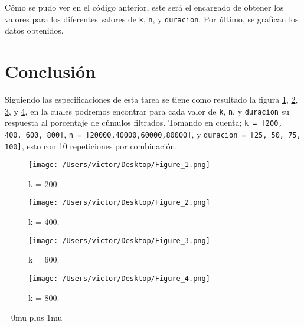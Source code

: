 \documentclass{article}
\begin{document}
Cómo se pudo ver en el código anterior, este será el encargado de obtener los valores para los diferentes valores de \texttt{k}, \texttt{n}, y \texttt{duracion}. Por último, se grafícan los datos obtenidos. \\


\section{Conclusión}

Siguiendo las especificaciones de esta tarea se tiene como resultado la figura \ref{fig:cuadro.1}, \ref{fig:cuadro.2}, \ref{fig:cuadro.3}, y \ref{fig:cuadro.4}, en la cuales podremos encontrar para cada valor de \texttt{k}, \texttt{n}, y \texttt{duracion} su respuesta al porcentaje de cúmulos filtrados. Tomando en cuenta; \texttt{k = [200, 400, 600, 800]}, \texttt{n = [20000,40000,60000,80000]}, y \texttt{duracion = [25, 50, 75, 100]}, esto con 10 repeticiones por combinación.


\begin{figure}[H]
\begin{center}
	\texttt{[image: /Users/victor/Desktop/Figure\_1.png]}
	\caption{ k = 200.}
	\label{fig:cuadro.1}
\end{center}
\end{figure}

\begin{figure}[H]
\begin{center}
	\texttt{[image: /Users/victor/Desktop/Figure\_2.png]}
	\caption{ k = 400.}
	\label{fig:cuadro.2}
\end{center}
\end{figure}

\begin{figure}[H]
\begin{center}
	\texttt{[image: /Users/victor/Desktop/Figure\_3.png]}
	\caption{ k = 600.}
	\label{fig:cuadro.3}
\end{center}
\end{figure}

\begin{figure}[H]
\begin{center}
	\texttt{[image: /Users/victor/Desktop/Figure\_4.png]}
	\caption{ k = 800.}
	\label{fig:cuadro.4}
\end{center}
\end{figure}


\Urlmuskip=0mu plus 1mu\relax


\end{document}
